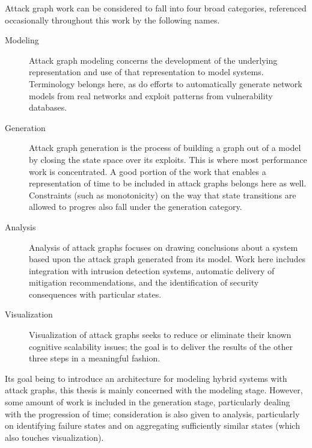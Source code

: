 Attack graph work can be considered to fall into four broad categories, referenced
occasionally throughout this work by the following names.
\begin{description}
\item[Modeling] Attack graph modeling concerns the development of the underlying representation
	and use of that representation to model systems. Terminology belongs here, as do efforts to
	automatically generate network models from real networks and exploit patterns from vulnerability
	databases.
\item[Generation] Attack graph generation is the process of building a graph out of a model by
	closing the state space over its exploits. This is where most performance work is concentrated.
	A good portion of the work that enables a representation of time to be included in attack graphs
	belongs here as well. Constraints (such as monotonicity) on the way that state transitions are 
	allowed to progres also fall under the generation category.
\item[Analysis] Analysis of attack graphs focuses on drawing conclusions about a system based upon
	the attack graph generated from its model. Work here includes integration with intrusion detection
	systems, automatic delivery of mitigation recommendations, and the identification of security
	consequences with particular states.
\item[Visualization] Visualization of attack graphs seeks to reduce or eliminate their
	known cognitive scalability issues; the goal is to deliver the results of the other three
	steps in a meaningful fashion.
\end{description}

Its goal being to introduce an architecture for modeling hybrid systems with
attack graphs, this thesis is mainly concerned with the modeling stage. However, 
some amount of work is included in the generation stage, particularly
dealing with the progression of time; consideration is also given to analysis, 
particularly on identifying failure states and
on aggregating sufficiently similar states (which also touches visualization).




